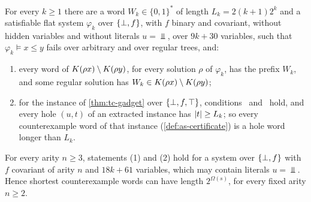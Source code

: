 \begin{proposition}\label{prop:cx-length}
For every $k\ge1$ there are a word $W_k\in\{0,1\}^*$ of length
$L_k=2(k+1)2^k$ and a satisfiable flat system $\varphi_k$ over $\{\bot,f\}$, with $f$
binary and covariant, without hidden variables and without literals $u=\Bot$,
over $9k+30$ variables, such that $\varphi_k\models x\le y$ fails over arbitrary
and over regular trees, and:
\begin{enumerate}[leftmargin=*]
\item every word of $K(\rho x)\setminus K(\rho y)$, for every solution
  $\rho$ of $\varphi_k$, has the prefix $W_k$, and some regular solution has
  $W_k\in K(\rho x)\setminus K(\rho y)$;
\item for the instance of \cref{thm:tc-gadget} over $\{\bot,f,\top\}$, conditions \CondI\
  and \CondU\ hold, and every hole $(u,t)$ of an extracted instance has
  $\lvert t\rvert\ge L_k$; so every counterexample word of that instance
  (\cref{def:as-certificate}) is a hole word longer than $L_k$.
\end{enumerate}
For every arity $n\ge3$, statements (1) and (2) hold for a system over $\{\bot,f\}$
with $f$ covariant of arity $n$ and $18k+61$ variables, which may contain
literals $u=\Bot$.
Hence shortest counterexample words can have length $2^{\Omega(s)}$, for every
fixed arity $n\ge2$.
\end{proposition}

